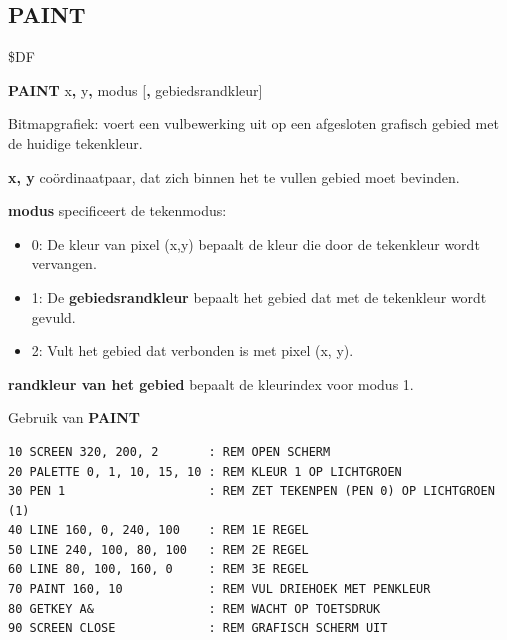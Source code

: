 
\newpage
\subsection{PAINT}
\begin{description}[leftmargin=2cm,style=nextline]
\item [Token:]    \$DF

\item [Formaat:]   {\bf PAINT} x{\bf,} y{\bf,} modus [{\bf,} gebiedsrandkleur]

\item [Gebruik:]    Bitmapgrafiek: voert een vulbewerking uit op een afgesloten grafisch gebied met de huidige tekenkleur.

                  {\bf x, y} coördinaatpaar, dat zich binnen het te vullen gebied moet bevinden.

                  {\bf modus} specificeert de tekenmodus:
                  \begin{itemize}
                     \item 0: De kleur van pixel (x,y) bepaalt de kleur die door de tekenkleur wordt vervangen.                     \item 1: De {\bf gebiedsrandkleur} bepaalt het gebied dat met de tekenkleur wordt gevuld.                     \item 2: Vult het gebied dat verbonden is met pixel (x, y).
                  \end{itemize}

                  {\bf randkleur van het gebied} bepaalt de kleurindex voor modus 1.

\item [Voorbeeld:]  Gebruik van {\bf PAINT}

\begin{tcolorbox}[colback=black,coltext=white]
\verbatimfont{\codefont}
\begin{verbatim}
10 SCREEN 320, 200, 2       : REM OPEN SCHERM
20 PALETTE 0, 1, 10, 15, 10 : REM KLEUR 1 OP LICHTGROEN
30 PEN 1                    : REM ZET TEKENPEN (PEN 0) OP LICHTGROEN (1)
40 LINE 160, 0, 240, 100    : REM 1E REGEL
50 LINE 240, 100, 80, 100   : REM 2E REGEL
60 LINE 80, 100, 160, 0     : REM 3E REGEL
70 PAINT 160, 10            : REM VUL DRIEHOEK MET PENKLEUR
80 GETKEY A&                : REM WACHT OP TOETSDRUK
90 SCREEN CLOSE             : REM GRAFISCH SCHERM UIT
\end{verbatim}
\end{tcolorbox}
\end{description}

